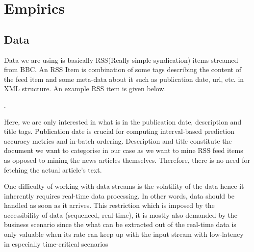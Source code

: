 \documentclass[12pt]{article}
\begin{document}
\section{Empirics}
\subsection{Data}
Data we are using is basically RSS(Really simple syndication) items streamed from BBC. An RSS Item is combination of some tags describing the content of the feed item and some meta-data about it such as publication date, url, etc. in XML structure. An example RSS item is given below.

    .

Here, we are only interested in what is in the publication date, description and title tags. Publication date is crucial for computing interval-based prediction accuracy metrics and in-batch ordering. Description and title constitute the document we want to categorise in our case as we want to mine RSS feed items as opposed to mining the news articles themselves. Therefore, there is no need for fetching the actual article's text. 


One difficulty of working with data streams is the volatility of the data hence it inherently requires real-time data processing. In other words, data should be handled as soon as it arrives. This restriction which is imposed by the accessibility of data (sequenced, real-time), it is mostly also demanded by the business scenario since the what  can be extracted out of the real-time data is only valuable when its rate can keep up with the input stream with low-latency in especially time-critical scenarios
\end{document}
